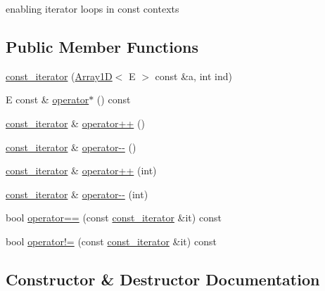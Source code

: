 enabling iterator loops in const contexts \subsection*{Public Member Functions}
\begin{DoxyCompactItemize}
\item 
\hyperlink{classbridges_1_1datastructure_1_1_array1_d_1_1const__iterator_a1ea421b46a3f0907190a91752e1f5b32}{const\+\_\+iterator} (\hyperlink{classbridges_1_1datastructure_1_1_array1_d}{Array1D}$<$ E $>$ const \&a, int ind)
\item 
E const  \& \hyperlink{classbridges_1_1datastructure_1_1_array1_d_1_1const__iterator_aec062ef1375b53092b872838c415081f}{operator$\ast$} () const
\item 
\hyperlink{classbridges_1_1datastructure_1_1_array1_d_1_1const__iterator}{const\+\_\+iterator} \& \hyperlink{classbridges_1_1datastructure_1_1_array1_d_1_1const__iterator_a754c1601b52473d4c8abc5e20af62b81}{operator++} ()
\item 
\hyperlink{classbridges_1_1datastructure_1_1_array1_d_1_1const__iterator}{const\+\_\+iterator} \& \hyperlink{classbridges_1_1datastructure_1_1_array1_d_1_1const__iterator_a700c9de64036c2cb61836e1ddc23cc1c}{operator-\/-\/} ()
\item 
\hyperlink{classbridges_1_1datastructure_1_1_array1_d_1_1const__iterator}{const\+\_\+iterator} \& \hyperlink{classbridges_1_1datastructure_1_1_array1_d_1_1const__iterator_aa7eb1bbe97e8f3257dc7d850be8f5937}{operator++} (int)
\item 
\hyperlink{classbridges_1_1datastructure_1_1_array1_d_1_1const__iterator}{const\+\_\+iterator} \& \hyperlink{classbridges_1_1datastructure_1_1_array1_d_1_1const__iterator_a815972df8b28780f88dac8133322e8ab}{operator-\/-\/} (int)
\item 
bool \hyperlink{classbridges_1_1datastructure_1_1_array1_d_1_1const__iterator_a004eca869afdc913a1d1a448bb4b7871}{operator==} (const \hyperlink{classbridges_1_1datastructure_1_1_array1_d_1_1const__iterator}{const\+\_\+iterator} \&it) const
\item 
bool \hyperlink{classbridges_1_1datastructure_1_1_array1_d_1_1const__iterator_ada463ec150271769b2a9e34c9bebdd05}{operator!=} (const \hyperlink{classbridges_1_1datastructure_1_1_array1_d_1_1const__iterator}{const\+\_\+iterator} \&it) const
\end{DoxyCompactItemize}


\subsection{Constructor \& Destructor Documentation}
\mbox{\label{classbridges_1_1datastructure_1_1_array1_d_1_1const__iterator_a1ea421b46a3f0907190a91752e1f5b32}} 
